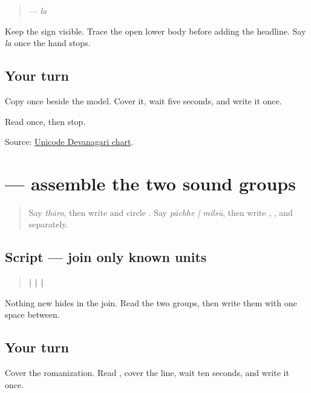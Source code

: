 \begin{quote}
\textbf{} — \emph{la}
\end{quote}

Keep the sign visible. Trace the open lower body before adding the headline. Say \emph{la} once the hand stops.

\subsection*{Your turn}
Copy \textbf{} once beside the model. Cover it, wait five seconds, and write it once.

\begin{tcolorbox}[breakable,colback=teal!4,colframe=teal!35!black,title={Before you move on}]
Read \textbf{} once, then stop.

Source: \href{https://www.unicode.org/charts/PDF/U0900.pdf}{Unicode Devanagari chart}.
\end{tcolorbox}
\section[\texorpdfstring{\mw{पाछे} \mw{मिलसू} (pāchhe milsū)}{पाछे मिलसू (pāchhe milsū)}]{  — assemble the two sound groups}

\label{lesson:MW-C07-read-later}



\begin{quote}
Say \emph{thāro}, then write \textbf{  } and circle \textbf{}. Say \emph{pāchhe | milsū}, then write \textbf{}, \textbf{}, and \textbf{} separately.
\end{quote}

\subsection*{Script — join only known units}
\begin{quote}
\textbf{ |     |  | }
\end{quote}

\begin{quote}
\textbf{ }
\end{quote}

Nothing new hides in the join. Read the two groups, then write them with one space between.

\subsection*{Your turn}
Cover the romanization. Read \textbf{ }, cover the line, wait ten seconds, and write it once.

